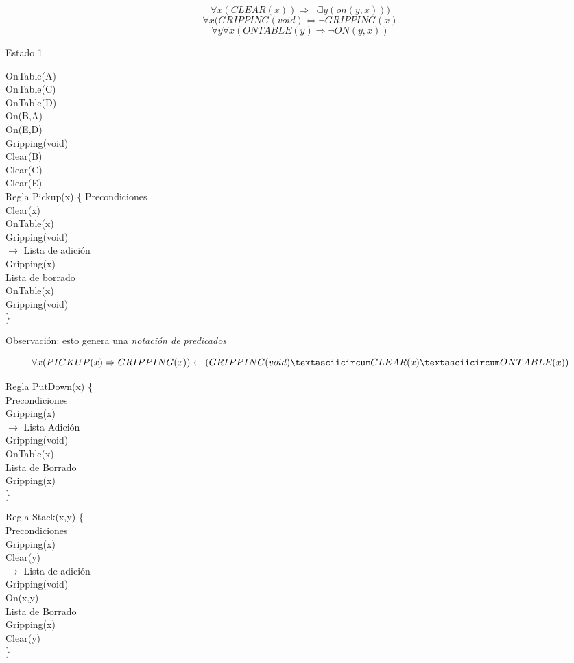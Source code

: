 $$\forall x (CLEAR(x)) \Rightarrow \neg \exists y (on(y,x)))$$
$$\forall x (GRIPPING (void) \Leftrightarrow \neg GRIPPING (x)$$
$$\forall y \forall x (ONTABLE (y) \Rightarrow \neg ON (y , x ))$$


Estado 1

	OnTable(A)\\
	OnTable(C)\\
	OnTable(D)\\
	On(B,A)\\
	On(E,D)\\
	Gripping(void) \\
	Clear(B) \\
	Clear(C) \\ 
	Clear(E)\\ 


Regla Pickup(x) \{
	Precondiciones \\
	Clear(x) \\
	OnTable(x) \\
	Gripping(void) \\
$\rightarrow$
	Lista de adición \\
	Gripping(x) \\ 
	Lista de borrado \\
	OnTable(x) \\
	Gripping(void) \\
\}


Observación: esto genera una \textit{notación de predicados}
 
$$ \forall x (PICKUP (x) \Rightarrow GRIPPING (x)) \leftarrow (GRIPPING (void) \textasciicircum CLEAR (x) \textasciicircum ONTABLE (x))
$$

Regla PutDown(x) \{ \\
	Precondiciones \\
	Gripping(x) \\
	$\rightarrow$
	Lista Adición \\
	Gripping(void) \\
	OnTable(x) \\
	Lista de Borrado \\
	Gripping(x) \\
\}

Regla Stack(x,y) \{ \\
	Precondiciones \\
	Gripping(x) \\
	Clear(y) \\
	$\rightarrow$ 
	Lista de adición \\
	Gripping(void) \\
	On(x,y) \\
	Lista de Borrado \\
	Gripping(x) \\
	Clear(y) \\
\}

